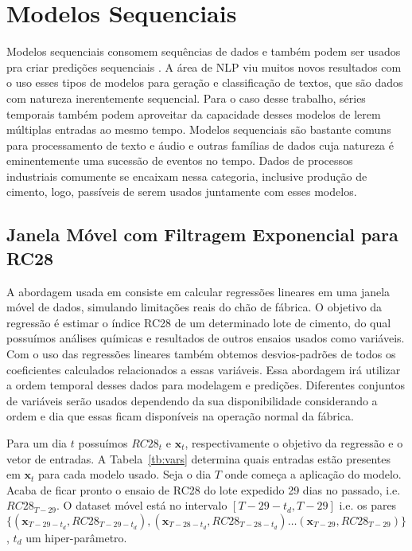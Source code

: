\section{Modelos Sequenciais}

Modelos sequenciais consomem sequências de dados e também podem ser usados pra
criar predições sequenciais \citep{dlbook}. A área de NLP viu muitos novos
resultados com o uso esses tipos de modelos para geração e classificação de textos, que são dados com
natureza inerentemente sequencial. Para o caso desse trabalho, séries temporais também podem
aproveitar da capacidade desses modelos de lerem múltiplas entradas ao mesmo
tempo. Modelos sequenciais são bastante comuns para processamento de texto e
áudio e outras famílias de dados cuja natureza é eminentemente uma sucessão de
eventos no tempo. Dados de processos industriais comumente se encaixam nessa
categoria, inclusive produção de cimento, logo, passíveis de serem usados
juntamente com esses modelos.



\subsection{Janela Móvel com Filtragem Exponencial para RC28 }
\label{ses:ewma}

A abordagem usada em \cite{grecialin} consiste em calcular regressões lineares em
uma janela móvel de dados, simulando limitações reais do chão de fábrica. O
objetivo da regressão é estimar o índice RC28 de um determinado lote de cimento,
do qual possuímos análises químicas e resultados de outros ensaios usados como
variáveis. Com o uso das regressões lineares também obtemos desvios-padrões de
todos os coeficientes calculados relacionados a essas variáveis. Essa abordagem irá utilizar a ordem temporal desses dados para
modelagem e predições. Diferentes conjuntos de variáveis serão usados dependendo
da sua disponibilidade considerando a ordem e dia que essas ficam disponíveis na
operação normal da fábrica.

Para um dia $t$ possuímos $RC28_t$ e $\textbf{x}_t$, respectivamente o objetivo
da regressão e o vetor de entradas. A Tabela~\ref{tb:vars} determina quais entradas estão presentes em $\textbf{x}_{t}$ para cada modelo usado.
Seja o dia $T$ onde começa a aplicação do modelo. Acaba de ficar pronto o ensaio
de RC28 do lote expedido 29 dias no passado, i.e. $RC28_{T-29}$.  O dataset móvel está no
intervalo $[T-29-t_d,T-29]$ i.e. os pares
$\{(\textbf{x}_{T-29-t_d},RC28_{T-29-t_d}), (\textbf{x}_{T-28-t_d},RC28_{T-28-t_d})
\dots (\textbf{x}_{T-29},RC28_{T-29})\}$, $t_d$ um hiper-parâmetro.

